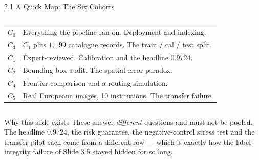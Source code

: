 \documentclass[aspectratio=169,11pt]{beamer}
\begin{document}
\begin{frame}{2.1 A Quick Map: The Six Cohorts}
\scriptsize
\begin{columns}[T]
\centering
{}

\vspace{-1mm}
{\tiny
\begin{tabular}{@{}p{0.7cm}p{6.0cm}@{}}
\textbf{$C_0$} & Everything the pipeline ran on. Deployment and indexing. \\[2pt]
\textbf{$C_3$} & $C_1$ plus $1{,}199$ catalogue records. The train / cal / test split. \\[2pt]
\textbf{$C_1$} & Expert-reviewed. Calibration and the headline $0.9724$. \\[2pt]
\textbf{$C_2$} & Bounding-box audit. The spatial error paradox. \\[2pt]
\textbf{$C_4$} & Frontier comparison and a routing simulation. \\[2pt]
\textbf{$C_5$} & Real Europeana images, 10 institutions. The transfer failure. \\
\end{tabular}}
\end{columns}
\vspace{-1mm}
\begin{alertblock}{\scriptsize Why this slide exists}
\scriptsize These answer \emph{different} questions and must not be pooled. The headline $0.9724$, the risk guarantee, the negative-control stress test and the transfer pilot each come from a different row --- which is exactly how the label-integrity failure of Slide 3.5 stayed hidden for so long.
\end{alertblock}
\end{frame}
\end{document}
